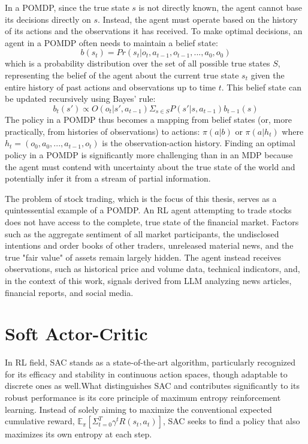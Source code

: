 In a \gls{POMDP}, since the true state \(s\) is not directly known, the agent cannot base its decisions directly on \(s\). Instead, the agent must operate based on the history of its actions and the observations it has received. To make optimal decisions, an agent in a POMDP often needs to maintain a belief state: 
\[b(s_t) = Pr(s_t | o_t, a_{t-1}, o_{t-1}, ..., a_0, o_0)\] 
which is a probability distribution over the set of all possible true states \(S\), representing the belief of the agent about the current true state \(s_t\) given the entire history of past actions and observations up to time \(t\). This belief state can be updated recursively using Bayes' rule: 
\[b_t(s') \propto  O(o_t | s', a_{t-1}) \Sigma_{s \in S} P(s' | s, a_{t-1}) b_{t-1}(s)\] 
The policy in a \gls{POMDP} thus becomes a mapping from belief states (or, more practically, from histories of observations) to actions: \(\pi(a | b)\) or \(\pi(a | h_t)\) where \(h_t = (o_0, a_0, ..., a_{t-1}, o_t)\) is the observation-action history. Finding an optimal policy in a \gls{POMDP} is significantly more challenging than in an \gls{MDP} because the agent must contend with uncertainty about the true state of the world and potentially infer it from a stream of partial information.

The problem of stock trading, which is the focus of this thesis, serves as a quintessential example of a \gls{POMDP}. An \gls{RL} agent attempting to trade stocks does not have access to the complete, true state of the financial market. Factors such as the aggregate sentiment of all market participants, the undisclosed intentions and order books of other traders, unreleased material news, and the true "fair value" of assets remain largely hidden. The agent instead receives observations, such as historical price and volume data, technical indicators, and, in the context of this work, signals derived from \gls{LLM} analyzing news articles, financial reports, and social media. 

\section{Soft Actor-Critic}
\label{sec:sac}
In \gls{RL} field, \gls{SAC} stands as a state-of-the-art algorithm, particularly recognized for its efficacy and stability in continuous action spaces, though adaptable to discrete ones as well.What distinguishes \gls{SAC} and contributes significantly to its robust performance is its core principle of maximum entropy reinforcement learning. Instead of solely aiming to maximize the conventional expected cumulative reward, \(\mathbb{E}_\pi[\Sigma_{t=0}^T \gamma^t R(s_t, a_t)]\), \gls{SAC} seeks to find a policy that also maximizes its own entropy at each step.

